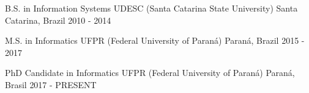 

\begin{cventries}

  \cventry
    {B.S. in Information Systems} %
    {UDESC (Santa Catarina State University)} %
    {Santa Catarina, Brazil} %
    {2010 - 2014} %
    {
    }

  \cventry
	{M.S. in Informatics} %
	{UFPR (Federal University of Paraná)} %
	{Paraná, Brazil} %
	{2015 - 2017} %
	{
	}
	
	
	\cventry
	{PhD Candidate in Informatics} %
	{UFPR (Federal University of Paraná)} %
	{Paraná, Brasil} %
	{2017 - PRESENT} %
	{	
	}

\end{cventries}
